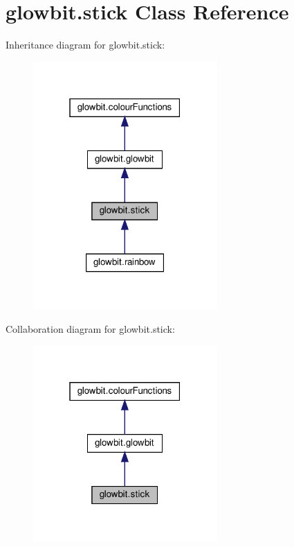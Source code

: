 \hypertarget{classglowbit_1_1stick}{}\section{glowbit.\+stick Class Reference}
\label{classglowbit_1_1stick}


Inheritance diagram for glowbit.\+stick\+:\nopagebreak
\begin{figure}[H]
\begin{center}
\leavevmode
\includegraphics[width=199pt]{classglowbit_1_1stick__inherit__graph}
\end{center}
\end{figure}


Collaboration diagram for glowbit.\+stick\+:\nopagebreak
\begin{figure}[H]
\begin{center}
\leavevmode
\includegraphics[width=199pt]{classglowbit_1_1stick__coll__graph}
\end{center}
\end{figure}
